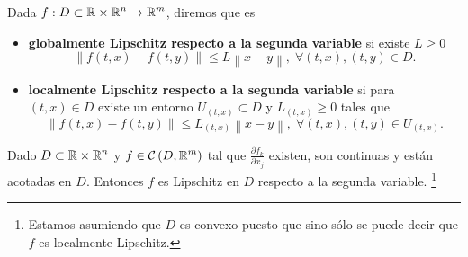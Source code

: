 \begin{definition}
Dada $\displaystyle f : D\subset\mathbb{R}\times\mathbb{R}^{n}\to\mathbb{R}^{m} $, diremos que es
\begin{itemize}
\item \textbf{globalmente Lipschitz respecto a la segunda variable} si existe $\displaystyle L \geq0 $ 
	\[ \left\|f\left(t, x\right)-f\left(t,y\right)\right\| \leq L \left\|x-y\right\|, \; \forall \left(t,x\right), \left(t,y\right)\in D .\]
	
\item \textbf{localmente Lipschitz respecto a la segunda variable} si para $\displaystyle \left(t, x\right)\in D $ existe un entorno $\displaystyle U_{\left(t,x\right)}\subset D $ y $\displaystyle L_{\left(t,x\right)}\geq 0  $ tales que 
	\[ \left\|f\left(t,x\right)-f\left(t,y\right)\right\|\leq L_{\left(t,x\right)} \left\|x-y\right\| , \; \forall\left(t,x\right),\left(t,y\right)\in U_{\left(t,x\right)}.\]
\end{itemize}
\end{definition}
\begin{prop}
Dado $\displaystyle D \subset \mathbb{R}\times\mathbb{R}^{n} $ y $\displaystyle f \in \mathcal{C}\left(D, \mathbb{R}^{m}\right) $ tal que $\displaystyle \frac{\partial f_{k}}{\partial x_{j}} $ existen, son continuas y están acotadas en $\displaystyle D $. Entonces $\displaystyle f $ es Lipschitz en $\displaystyle D $ respecto a la segunda variable. \footnote{Estamos asumiendo que $\displaystyle D $ es convexo puesto que sino sólo se puede decir que $\displaystyle f $ es localmente Lipschitz.}  
\end{prop}
